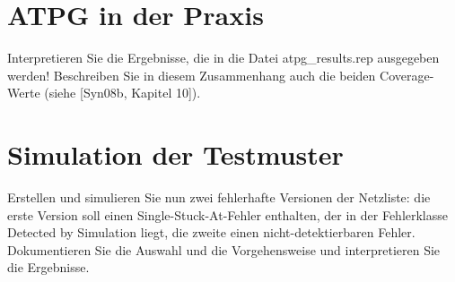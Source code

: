 \documentclass[12pt,a4paper]{article}
\begin{document}
\section{ATPG in der Praxis}

Interpretieren Sie die Ergebnisse, die in die Datei atpg\_results.rep ausgegeben werden! Beschreiben Sie in diesem Zusammenhang auch die beiden Coverage-Werte (siehe [Syn08b, Kapitel 10]).

\section{Simulation der Testmuster}

Erstellen und simulieren Sie nun zwei fehlerhafte Versionen der Netzliste: die erste Version soll einen Single-Stuck-At-Fehler enthalten, der in der Fehlerklasse Detected by Simulation liegt, die zweite einen nicht-detektierbaren Fehler. Dokumentieren Sie die Auswahl und die Vorgehensweise und interpretieren Sie die Ergebnisse.
\end{document}

